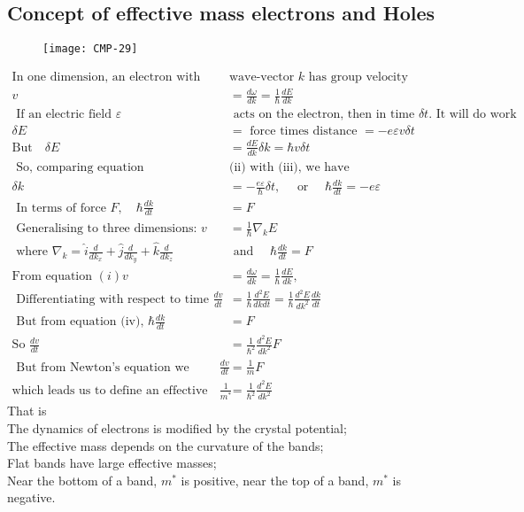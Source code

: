 \subsection{Concept of effective mass electrons and Holes}
\begin{figure}[H]
	\centering
	\texttt{[image: CMP-29]}
	\caption{}
	\label{}
\end{figure}
\begin{align*}
\text{In one dimension, an electron with }&\text{wave-vector $k$ has group velocity}\\
v&=\frac{d \omega}{d k}=\frac{1}{\hbar} \frac{d E}{d k}\\
\text { If an electric field } \varepsilon &\text { acts on the electron, then in time } \delta t \text {. It will do work }\\
\delta E&=\text { force times distance }=-e \varepsilon v \delta t \\
\text{But}\quad \delta E&=\frac{d E}{d k} \delta k=\hbar v \delta t\\
\text { So, comparing equation  }&\text{(ii) with (iii), we have}\\
\delta k&=-\frac{e \varepsilon}{\hbar} \delta t, \quad \text { or } \quad \hbar \frac{d k}{d t}=-e \varepsilon\\
\text { In terms of force } F, \quad \hbar \frac{d k}{d t}&=F\\
\text { Generalising to three dimensions: } v&=\frac{1}{\hbar} \nabla_{k} E\\
\text { where } \nabla_{k}=\hat{i} \frac{d}{d k_{x}}+\hat{j} \frac{d}{d k_{y}}+\hat{k} \frac{d}{d k_{z}} \quad &\text { and } \quad \hbar \frac{d k}{d t}=F\\
\text{From equation }
(i) v&=\frac{d \omega}{d k}=\frac{1}{\hbar} \frac{d E}{d k},\\
\text { Differentiating with respect to time } \frac{d v}{d t}&=\frac{1}{\hbar} \frac{d^{2} E}{d k d t}=\frac{1}{\hbar} \frac{d^{2} E}{d k^{2}} \frac{d k}{d t}\\
\text { But from equation (iv), } \hbar \frac{d k}{d t}&=F\\
\text{So }
\frac{d v}{d t}&=\frac{1}{\hbar^{2}} \frac{d^{2} E}{d k^{2}} F\\
\text { But from Newton's equation we expect } \frac{d v}{d t}&=\frac{1}{m} F\\
\text{which leads us to define an effective mass }
\frac{1}{m^{*}}&=\frac{1}{\hbar^{2}} \frac{d^{2} E}{d k^{2}}
\end{align*}
That is\\
The dynamics of electrons is modified by the crystal potential;\\
The effective mass depends on the curvature of the bands;\\
Flat bands have large effective masses;\\
Near the bottom of a band, $m^{*}$ is positive, near the top of a band, $m^{*}$ is negative.\\
